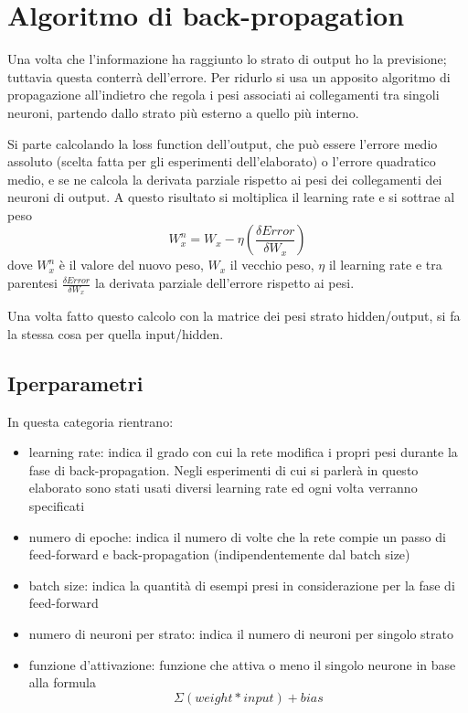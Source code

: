 \documentclass[12pt]{report}
\begin{document}
\section{Algoritmo di back-propagation}
Una volta che l’informazione ha raggiunto lo strato di output ho la previsione; tuttavia questa conterrà dell’errore. Per ridurlo si usa un apposito algoritmo di propagazione all’indietro che regola i pesi associati ai collegamenti tra singoli neuroni, partendo dallo strato più esterno a quello più interno.

Si parte calcolando la loss function dell’output, che può essere l’errore medio assoluto (scelta fatta per gli esperimenti dell'elaborato) o l’errore quadratico medio, e se ne calcola la derivata parziale rispetto ai pesi dei collegamenti dei neuroni di output. A questo risultato si moltiplica il learning rate e si sottrae al peso $$W^n_x = W_x - \eta \left(\frac{\delta Error}{\delta W_x}\right)$$ dove $W^n_x$ è il valore del nuovo peso, $W_x$ il vecchio peso, $\eta$ il learning rate e tra parentesi $\frac{\delta Error}{\delta W_x}$ la derivata parziale dell'errore rispetto ai pesi. 

Una volta fatto questo calcolo con la matrice dei pesi strato hidden/output, si fa la stessa cosa per quella input/hidden.

\subsection{Iperparametri}\label{iperparametri}
In questa categoria rientrano:
\begin{itemize}
\item{learning rate}: indica il grado con cui la rete modifica i propri pesi durante la fase di back-propagation. Negli esperimenti di cui si parlerà in questo elaborato sono stati usati diversi learning rate ed ogni volta verranno specificati
\item{numero di epoche}: indica il numero di volte che la rete compie un passo di feed-forward e back-propagation (indipendentemente dal batch size)
\item{batch size}: indica la quantità di esempi presi in considerazione per la fase di feed-forward
\item{numero di neuroni per strato}: indica il numero di neuroni per singolo strato
\item{funzione d'attivazione}: funzione che attiva o meno il singolo neurone in base alla formula $$\Sigma\left(weight * input\right) + bias$$
\end{itemize}
\end{document}
